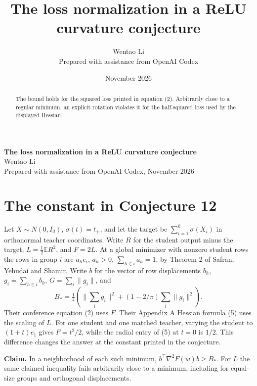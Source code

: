 \documentclass[10pt]{article}
\title{The loss normalization in a ReLU curvature conjecture}
\author{Wentao Li\\{\small Prepared with assistance from OpenAI Codex}}
\date{November 2026}
\begin{document}
\begin{center}{\Large\bfseries The loss normalization in a ReLU curvature conjecture}\\[3pt]Wentao Li\\{\small Prepared with assistance from OpenAI Codex, November 2026}\end{center}
\begin{abstract}
The bound holds for the squared loss printed in equation (2). Arbitrarily close to a regular minimum, an explicit rotation violates it for the half-squared loss used by the displayed Hessian.
\end{abstract}
\section*{The constant in Conjecture 12}
Let $X\sim N(0,I_d)$, $\sigma(t)=t_+$, and let the target be $\sum_{i=1}^k\sigma(X_i)$ in orthonormal teacher coordinates. Write $R$ for the student output minus the target, $L=\frac12\mathbb E R^2$, and $F=2L$. At a global minimizer with nonzero student rows the rows in group $i$ are $a_he_i$, $a_h>0$, $\sum_{h\in i}a_h=1$, by Theorem 2 of Safran, Yehudai and Shamir. Write $b$ for the vector of row displacements $b_h$, $g_i=\sum_{h\in i}b_h$, $G=\sum_i\|g_i\|$, and
\[
 B_*=\tfrac14\left(\|\textstyle\sum_i g_i\|^2+(1-2/\pi)\textstyle\sum_i\|g_i\|^2\right).
\]
Their conference equation (2) uses $F$. Their Appendix A Hessian formula (5) uses the scaling of $L$. For one student and one matched teacher, varying the student to $(1+t)e_1$ gives $F=t^2/2$, while the radial entry of (5) at $t=0$ is $1/2$. This difference changes the answer at the constant printed in the conjecture.

\textbf{Claim.} In a neighborhood of each such minimum, $b^\top\nabla^2F(w)b\ge B_*$. For $L$ the same claimed inequality fails arbitrarily close to a minimum, including for equal-size groups and orthogonal displacements.
\end{document}
